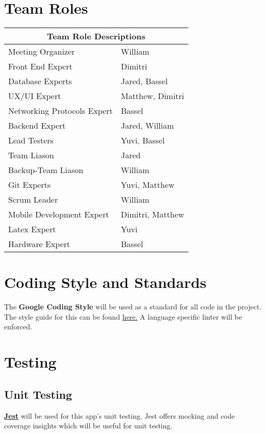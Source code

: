 \documentclass{article}
\begin{document}
	\section{Team Roles}
	\begin{tabular}{ |p{5cm}|p{8cm}| }
		\hline
		\multicolumn{2}{|c|}{Team Role Descriptions} \\
		\hline
		Meeting Organizer & William \\
		\hline
		Front End Expert & Dimitri \\
		\hline
		Database Experts  & Jared, Bassel \\
		\hline
		UX/UI Expert & Matthew, Dimitri \\
		\hline
		Networking Protocols Expert & Bassel \\
		\hline
		Backend Expert & Jared, William \\
		\hline
		Lead Testers & Yuvi, Bassel \\
		\hline
		Team Liason & Jared \\
		\hline
		Backup-Team Liason & William \\
		\hline
		Git Experts & Yuvi, Matthew\\
		\hline
		Scrum Leader & William \\
		\hline
		Mobile Development Expert & Dimitri, Matthew \\
		\hline
		Latex Expert & Yuvi \\
		\hline
		Hardware Expert & Bassel \\
		\hline
	\end{tabular}
	
	\section{Coding Style and Standards}
	The \textbf{Google Coding Style} will be used as a standard for all code in the project. \\
	The style guide for this can be found \hyperlink{https://google.github.io/styleguide/}{here.}
	A language specific linter will be enforced.
	
	\section{Testing}
	
	\subsection {Unit Testing}
	\textbf{\href{https://jestjs.io/}{Jest}} will be used for this app's unit testing. Jest offers mocking and code coverage insights which will be useful for unit testing.
	
\end{document}
